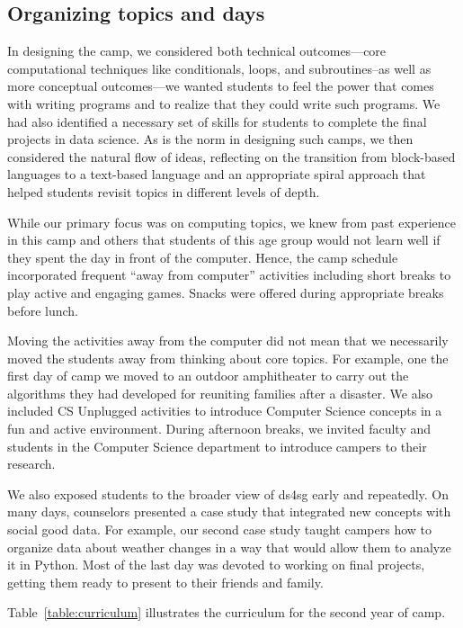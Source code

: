 \subsection{Organizing topics and days}

In designing the camp, we considered both technical outcomes---core
computational techniques like conditionals, loops, and subroutines--as
well as more conceptual outcomes---we wanted students to feel the
power that comes with writing programs and to realize that they
could write such programs.  We had also identified a necessary set
of skills for students to complete the final projects in data
science.  As is the norm in designing such camps, we then considered
the natural flow of ideas, reflecting on the transition from
block-based languages to a text-based language and an appropriate
spiral approach that helped students revisit topics in different
levels of depth.

While our primary focus was on computing topics, we knew from past
experience in this camp and others that students of this age group
would not learn well if they spent the day in front of the computer.
Hence, the camp schedule incorporated frequent ``away from computer''
activities including short breaks to play active and engaging games.
Snacks were offered during appropriate breaks before lunch. 

Moving the activities away from the computer did not mean that we
necessarily moved the students away from thinking about core topics.
For example, one the first day of camp we moved to an outdoor
amphitheater to carry out the algorithms they had developed for
reuniting families after a disaster.  We also included CS Unplugged
\cite{csunplugged} activities to introduce Computer Science concepts
in a fun and active environment.  During afternoon breaks, we invited
faculty and students in the Computer Science department to introduce
campers to their research.

We also exposed students to the broader view of ds4sg early and
repeatedly.  On many days, counselors presented a case study that
integrated new concepts with social good data. For example, our
second case study taught campers how to organize data about weather
changes in a way that would allow them to analyze it in Python.
Most of the last day was devoted to working on final projects,
getting them ready to present to their friends and family.

Table~\ref{table:curriculum} illustrates the curriculum for the
second year of camp.

